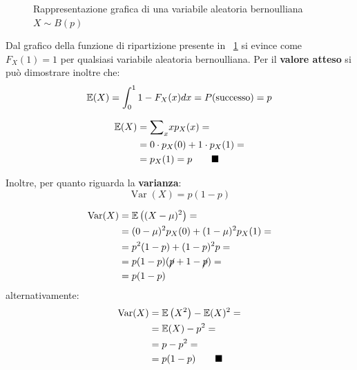 \begin{figure}[h]
{{
    }
}
    \caption{Rappresentazione grafica di una variabile aleatoria bernoulliana $X \sim B{(p)}$}
    \label{fig:bernoulli}
    \vspace{\abovedisplayskip}
\end{figure}

\noindent Dal grafico della funzione di ripartizione presente in \figurename \ \ref{fig:bernoulli} si evince come $F_X(1)=1$ per qualsiasi variabile aleatoria bernoulliana. Per il \textbf{valore atteso} si può dimostrare inoltre che: \[
\mathbb{E}(X) = \int_0^{1} 1 - F_X(x) dx = P(\text{successo}) = p
\]
\begin{dimostrazione}[$\E(X \sim B{(p)}) = p$]
\begin{align*}
    \mathbb{E}(X) &= {\sum}_x x p_X(x) = \\ 
    &= 0 \cdot p_X(0) + 1 \cdot p_X(1) = \\
    &= p_X(1) = p \tag*{$\blacksquare$}
\end{align*}
\end{dimostrazione}

\noindent Inoltre, per quanto riguarda la \textbf{varianza}: \[
\operatorname{Var}(X) = p(1-p)
\]

\begin{dimostrazione}
\begin{align*}
    \operatorname{Var}(X) &= \mathbb{E}\left((X-\mu)^2\right) =\\
    &= (0-\mu)^2 p_X(0) + (1-\mu)^2 p_X(1) = \\
    &= p^2(1-p) + (1-p)^2p = \\
    &= p(1-p)(\cancel p +1 - \cancel p) = \\
    &= p(1-p)
\end{align*}
alternativamente:
\begin{align*}
    \operatorname{Var}(X) &= \mathbb{E} \left( X^2 \right) - \mathbb{E}(X)^2 = \\
    &= \mathbb{E}(X) - p^2 = \\
    &= p-p^2 = \\
    &= p(1-p) \tag*{$\blacksquare$}
\end{align*}
\end{dimostrazione}

